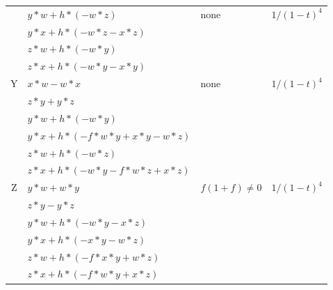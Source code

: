 \documentclass[12]{article}
\begin{document}
\begin{longtable}[c]{|c|p{5.75cm}|p{2.75cm}|c|}
   & $ y*w + h*(-w*z) $ & none & $ 1/(1-t)^4 $ \\  
   & $ y*x + h*(-w*z - x*z ) $ & & \\  
   & $ z*w + h*(-w*y ) $ & & \\ 
   & $ z*x + h*(-w*y - x*y ) $ & &  \\  
\hline
 Y & $ x*w - w*x $ &\multirow{6}{*}{none} &\multirow{6}{*}{$ 1/(1-t)^4 $} \\ 
    & $ z*y + y*z $ & &  \\ 
   & $ y*w + h*(-w*y) $ & & \\
   & $ y*x + h*(-f*w*y + x*y - w*z ) $ & & \\  
   & $ z*w + h*(-w*z ) $ & & \\ 
   & $ z*x + h*(-w*y - f*w*z + x*z ) $ & &  \\  
\hline
 Z & $ y*w + w*y $ &\multirow{6}{*}{ $ f(1+f) \neq 0 $} &\multirow{6}{*}{$ 1/(1-t)^4 $} \\ 
    & $ z*y - y*z $ & &  \\ 
   & $ y*w + h*(-w*y - x*z ) $ & & \\  
   & $ y*x + h*(-x*y - w*z ) $ & & \\  
   & $ z*w + h*(-f*x*y + w*z ) $ & & \\ 
   & $ z*x + h*(-f*w*y + x*z ) $ & &  \\  
\bottomrule
\end{longtable}
\end{document}
